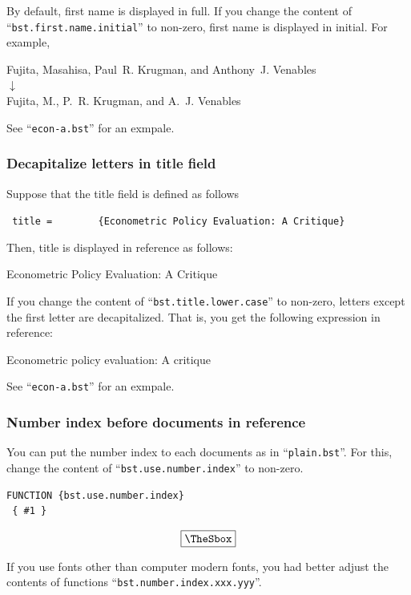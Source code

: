 \documentclass[10pt]{article}
\newenvironment{Frame}%
{\setlength{\fboxsep}{15pt}
\setlength{\mylength}{\linewidth}%
\addtolength{\mylength}{-2\fboxsep}%
\addtolength{\mylength}{-2\fboxrule}%
\Sbox
\minipage{\mylength}%
\setlength{\abovedisplayskip}{0pt}%
\setlength{\belowdisplayskip}{0pt}%
}%
{\endminipage\endSbox
\[\fbox{\TheSbox}\]}
\begin{document}
By default, first name is displayed in full.  If you change the content
of ``\texttt{bst.first.name.initial}'' to non-zero, first name is displayed
in initial.  For example,
\begin{center}
Fujita, Masahisa, Paul~R. Krugman, and Anthony~J. Venables \\
 $\downarrow$ \\
Fujita, M., P.~R. Krugman, and A.~J. Venables
\end{center}

See ``\texttt{econ-a.bst}'' for an exmpale.

\subsubsection{Decapitalize letters in title field}

Suppose that the title field is defined as follows
\begin{center}
  \verb| title =        {Econometric Policy Evaluation: A Critique}|
\end{center}

Then, title is displayed in reference as follows:
\begin{center}
 Econometric Policy Evaluation: A Critique
\end{center}

If you change the content of ``\texttt{bst.title.lower.case}'' to
non-zero, letters except the first letter are decapitalized.  That is,
you get the following expression in reference:
\begin{center}
 Econometric policy evaluation: A critique
\end{center}

See ``\texttt{econ-a.bst}'' for an exmpale.


\subsubsection{Number index before documents in reference}

You can put the number index to each documents as in
``\texttt{plain.bst}''.  For this, change the content of
``\texttt{bst.use.number.index}'' to non-zero.
\begin{Frame}
\begin{verbatim}
FUNCTION {bst.use.number.index}
 { #1 }
\end{verbatim}
\end{Frame}

If you use fonts other than computer modern fonts, you had better adjust
the contents of functions ``\texttt{bst.number.index.xxx.yyy}''.
\end{document}

